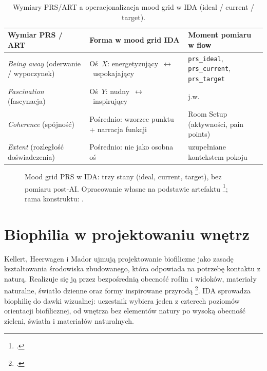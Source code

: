 \begin{table}[htbp]
  \centering
  \caption{Wymiary PRS/ART a operacjonalizacja mood grid w IDA (ideal / current / target).}
  \label{tab:ch02:prs-mood-grid}
  \begin{tabular}{@{}p{}p{}p{}@{}}
    \toprule
    Wymiar PRS / ART & Forma w mood grid IDA & Moment pomiaru w flow \\
    \midrule
    \emph{Being away} (oderwanie / wypoczynek)
      & Oś~$X$: energetyzujący~$\leftrightarrow$~uspokajający
      & \texttt{prs\_ideal}, \texttt{prs\_current}, \texttt{prs\_target} \\
    \emph{Fascination} (fascynacja)
      & Oś~$Y$: nudny~$\leftrightarrow$~inspirujący
      & j.w. \\
    \emph{Coherence} (spójność)
      & Pośrednio: wzorzec punktu + narracja funkcji
      & Room Setup (aktywności, pain points) \\
    \emph{Extent} (rozległość doświadczenia)
      & Pośrednio: nie jako osobna oś
      & uzupełniane kontekstem pokoju \\
    \bottomrule
  \end{tabular}
\end{table}

\begin{figure}[htbp]
  \centering
  \caption[Mood grid PRS w IDA: trzy stany (ideal, current, target), bez pomiaru post-AI. Opracowanie własne na podstawie artefaktu; rama konstruktu: Hartig i in.]{Mood grid PRS w IDA: trzy stany (ideal, current, target), bez pomiaru post-AI.
    Opracowanie własne na podstawie artefaktu \footcite{idaPlatform2026}; rama konstruktu: \textcite{hartig1997prs}.}
  \label{fig:ch02:prs-mood-grid}
\end{figure}

\section{Biophilia w projektowaniu wnętrz}
\label{ch02:sec:biophilia}

Kellert, Heerwagen i Mador ujmują projektowanie biofiliczne jako zasadę kształtowania środowiska zbudowanego, która odpowiada na potrzebę kontaktu z naturą. Realizuje się ją przez bezpośrednią obecność roślin i widoków, materiały naturalne, światło dzienne oraz formy inspirowane przyrodą \footcite{kellert2008biophilic}.
IDA sprowadza biophilię do dawki wizualnej: uczestnik wybiera jeden z czterech poziomów orientacji biofilicznej, od wnętrza bez elementów natury po wysoką obecność zieleni, światła i materiałów naturalnych.

